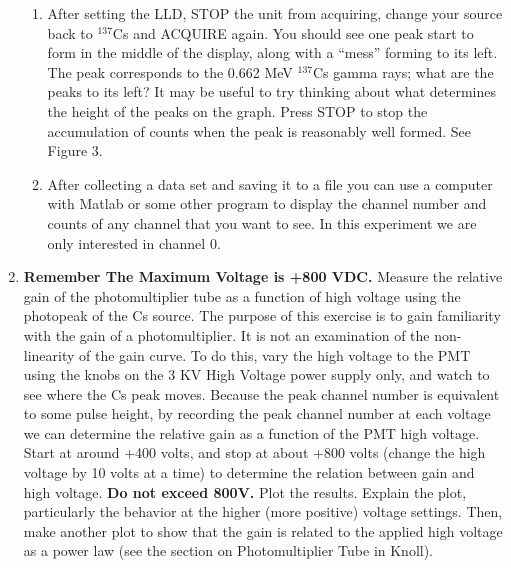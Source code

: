 \documentclass{../lab}
\begin{document}
\begin{enumerate}
\begin{enumerate}
        \item After setting the LLD, STOP the unit from acquiring, change your source back to $^{137}$Cs and ACQUIRE again. You should see one peak start to form in the middle of the display, along with a ``mess'' forming to its left. The peak corresponds to the 0.662 MeV $^{137}$Cs gamma rays; what are the peaks to its left? It may be useful to try thinking about what determines the height of the peaks on the graph. Press STOP to stop the accumulation of counts when the peak is reasonably well formed. See Figure 3.

        \item After collecting a data set and saving it to a file you can use a computer with Matlab or some other program to display the channel number and counts of any channel that you want to see. In this experiment we are only interested in channel 0.

    \end{enumerate}

    \item \textbf{Remember The Maximum Voltage is +800 VDC.} Measure the relative gain of the photomultiplier tube as a function of high voltage using the photopeak of the Cs source. The purpose of this exercise is to gain familiarity with the gain of a photomultiplier. It is not an examination of the non-linearity of the gain curve. To do this, vary the high voltage to the PMT using the knobs on the 3 KV High Voltage power supply only, and watch to see where the Cs peak moves. Because the peak channel number is equivalent to some pulse height, by recording the peak channel number at each voltage we can determine the relative gain as a function of the PMT high voltage. Start at around +400 volts, and stop at about +800 volts (change the high voltage by 10 volts at a time) to determine the relation between gain and high voltage. \textbf{Do not exceed 800V.} Plot the results. Explain the plot, particularly the behavior at the higher (more positive) voltage settings. Then, make another plot to show that the gain is related to the applied high voltage as a power law (see the section on Photomultiplier Tube in Knoll).


\end{enumerate}
\end{document}
